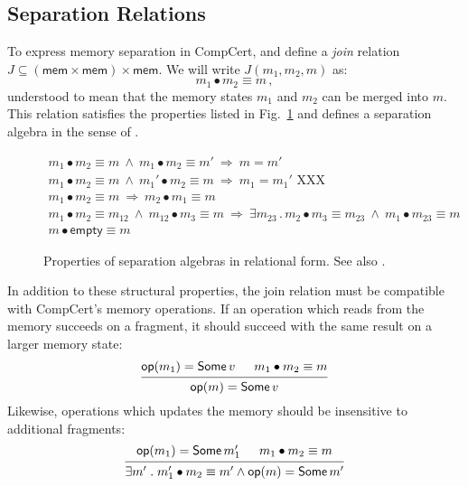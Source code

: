 \documentclass[acmsmall,screen,review,anonymous]{acmart}
\newcommand{\kw}[1]{\ensuremath{ \mathsf{#1} }}
\begin{document}
\subsection{Separation Relations} %

To express memory separation in CompCert,
and define a \emph{join} relation
$J \subseteq (\kw{mem} \times \kw{mem}) \times \kw{mem}$.
We will write $J(m_1, m_2, m)$ as:
\[
  m_1 \bullet m_2 \equiv m
  \,,
\]
understood to mean that
the memory states $m_1$ and $m_2$
can be merged into $m$.
This relation satisfies the properties listed in Fig.~\ref{fig:sepalg}
and defines a separation algebra in the sense of \citet{freshlook}.

\begin{figure}
  \begin{gather*}
    m_1 \bullet m_2 \equiv m \:\wedge\:
      m_1 \bullet m_2 \equiv m' \:\Rightarrow\:
      m = m'
      \\
    m_1 \bullet m_2 \equiv m \:\wedge\:
      m_1' \bullet m_2 \equiv m \:\Rightarrow\:
      m_1 = m_1'
      \text{ XXX}
      \\
    m_1 \bullet m_2 \equiv m \:\Rightarrow\:
      m_2 \bullet m_1 \equiv m
      \\
    m_1 \bullet m_2 \equiv m_{12} \:\wedge\:
      m_{12} \bullet m_3 \equiv m \:\Rightarrow\:
      \exists m_{23} \mathrel.
      m_2 \bullet m_3 \equiv m_{23} \:\wedge\:
      m_1 \bullet m_{23} \equiv m
      \\
    m \bullet \kw{empty} \equiv m
  \end{gather*}
  \caption{Properties of separation algebras
    in relational form. See also \citet{freshlook}.}
  \label{fig:sepalg}
\end{figure}

In addition to these structural properties,
the join relation must be compatible
with CompCert's memory operations.
If an operation which reads from the memory succeeds on a fragment,
it should succeed with the same result on a larger memory state:
\[
  \begin{prooftree}
    \hypo{\kw{op}(m_1) = \kw{Some}\,v}
    \hypo{m_1 \bullet m_2 \equiv m}
    \infer2{\kw{op}(m) = \kw{Some}\,v}
  \end{prooftree}
\]
Likewise,
operations which updates the memory
should be insensitive to additional fragments:
\[
  \begin{prooftree}
    \hypo{\kw{op}(m_1) = \kw{Some}\,m_1'}
    \hypo{m_1 \bullet m_2 \equiv m}
    \infer2{\exists m' \mathrel.
      m_1' \bullet m_2 \equiv m' \wedge
      \kw{op}(m) = \kw{Some}\,m'}
  \end{prooftree}
\]
\end{document}
